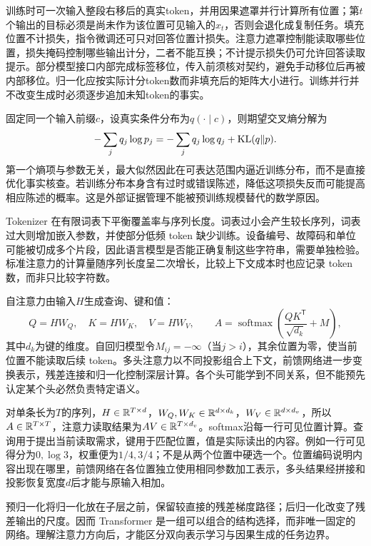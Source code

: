 训练时可一次输入整段右移后的真实token，并用因果遮罩并行计算所有位置；第$t$个输出的目标必须是尚未作为该位置可见输入的$x_t$，否则会退化成复制任务。填充位置不计损失，指令微调还可只对回答位置计损失。注意力遮罩控制能读取哪些位置，损失掩码控制哪些输出计分，二者不能互换；不计提示损失仍可允许回答读取提示。部分模型接口内部完成标签移位，传入前须核对契约，避免手动移位后再被内部移位。归一化应按实际计分token数而非填充后的矩阵大小进行。训练并行并不改变生成时必须逐步追加未知token的事实。

固定同一个输入前缀$c$，设真实条件分布为$q(\cdot\mid c)$，则期望交叉熵分解为
\begin{equation}
 -\sum_jq_j\log p_j=-\sum_jq_j\log q_j+\operatorname{KL}(q\|p).
\end{equation}
第一个熵项与参数无关，最大似然因此在可表达范围内逼近训练分布，而不是直接优化事实核查。若训练分布本身含有过时或错误陈述，降低这项损失反而可能提高相应陈述的概率。这是外部证据管理不能被预训练规模替代的数学原因。

Tokenizer 在有限词表下平衡覆盖率与序列长度。词表过小会产生较长序列，词表过大则增加嵌入参数，并使部分低频 token 缺少训练。设备编号、故障码和单位可能被切成多个片段，因此语言模型是否能正确复制这些字符串，需要单独检验。标准注意力的计算量随序列长度呈二次增长，比较上下文成本时也应记录 token 数，而非只比较字符数。

自注意力由输入$H$生成查询、键和值：
\begin{equation}
 Q=HW_Q,\quad K=HW_K,\quad V=HW_V,
 \qquad A=\operatorname{softmax}\left(\frac{QK^{\mathsf T}}{\sqrt{d_k}}+M\right),
\end{equation}
其中$d_k$为键的维度。自回归模型令$M_{ij}=-\infty$（当$j>i$），其余位置为零，使当前位置不能读取后续 token。多头注意力以不同投影组合上下文，前馈网络进一步变换表示，残差连接和归一化控制深层计算。各个头可能学到不同关系，但不能预先认定某个头必然负责特定语义。

对单条长为$T$的序列，$H\in\mathbb{R}^{T\times d}$，$W_Q,W_K\in\mathbb{R}^{d\times d_k}$，$W_V\in\mathbb{R}^{d\times d_v}$，所以$A\in\mathbb{R}^{T\times T}$，注意力读取结果为$AV\in\mathbb{R}^{T\times d_v}$。softmax沿每一行可见位置计算。查询用于提出当前读取需求，键用于匹配位置，值是实际读出的内容。例如一行可见得分为$0,\log3$，权重便为$1/4,3/4$；不是从两个位置中硬选一个。位置编码说明内容出现在哪里，前馈网络在各位置独立使用相同参数加工表示，多头结果经拼接和投影恢复宽度$d$后才能与原输入相加。

预归一化将归一化放在子层之前，保留较直接的残差梯度路径；后归一化改变了残差输出的尺度。因而 Transformer 是一组可以组合的结构选择，而非唯一固定的网络。理解注意力方向后，才能区分双向表示学习与因果生成的任务边界。

